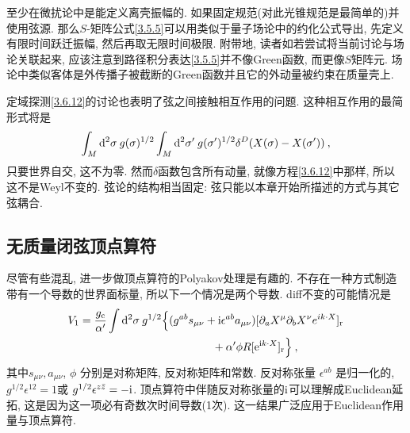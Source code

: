 至少在微扰论中是能定义离壳振幅的. 如果固定规范(对此光锥规范是最简单的)并使用弦源. 那么$S$-矩阵公式\eqref{3.5.5}可以用类似于量子场论中的约化公式导出, 先定义有限时间跃迁振幅, 然后再取无限时间极限. 附带地, 读者如若尝试将当前讨论与场论关联起来, 应该注意到路径积分表达\eqref{3.5.5}并不像Green函数, 而更像$S$矩阵元. 场论中类似客体是外传播子被截断的Green函数并且它的外动量被约束在质量壳上.

定域探测\eqref{3.6.12}的讨论也表明了弦之间接触相互作用的问题. 这种相互作用的最简形式将是
\begin{equation}
\int_{M} \mathrm{d}^{2} \sigma \: g(\sigma)^{1 / 2} \int_{M} \mathrm{d}^{2} \sigma^{\prime} \: g(\sigma^{\prime})^{1 / 2} \delta^{D}(X(\sigma)-X(\sigma^{\prime}))\:, \label{3.6.13}
\end{equation}
只要世界自交, 这不为零. 然而$\delta$函数包含所有动量, 就像方程\eqref{3.6.12}中那样, 所以这不是Weyl不变的. 弦论的结构相当固定: 弦只能以本章开始所描述的方式与其它弦耦合.

\subsection*{无质量闭弦顶点算符}

尽管有些混乱, 进一步做顶点算符的Polyakov处理是有趣的. 不存在一种方式制造带有一个导数的世界面标量, 所以下一个情况是两个导数. diff不变的可能情况是
\begin{align}
	V_{1}&=\frac{g_{\mathrm{c}}}{\alpha^{\prime}} \int \mathrm{d}^{2} \sigma \: g^{1 / 2}\Bigl\{ 
		(g^{a b} s_{\mu \nu}+\mathrm{i} \epsilon^{a b} a_{\mu \nu})
		[\partial_{a} X^{\mu} \partial_{b} X^{\nu} e^{i k \cdot X}]_{\mathrm{r}} \nonumber \\
		&\qquad \qquad \qquad \qquad \qquad \qquad  +\alpha^{\prime} \phi R[\mathrm{e}^{\mathrm{i} k \cdot X}]_{\mathrm{r}}\Bigr\}  \:, \label{3.6.14}
\end{align}
其中$s_{\mu \nu}, a_{\mu \nu}$,  $\phi$ 分别是对称矩阵, 反对称矩阵和常数. 反对称张量 $\epsilon^{a b}$ 是归一化的,  $g^{1 / 2} \epsilon^{12}=1$或 $g^{1 / 2} \epsilon^{z \bar{z}}=-\mathrm{i}$. 顶点算符中伴随反对称张量的$\mathrm{i}$可以理解成Euclidean延拓, 这是因为这一项必有奇数次时间导数(1次). 这一结果广泛应用于Euclidean作用量与顶点算符. 

